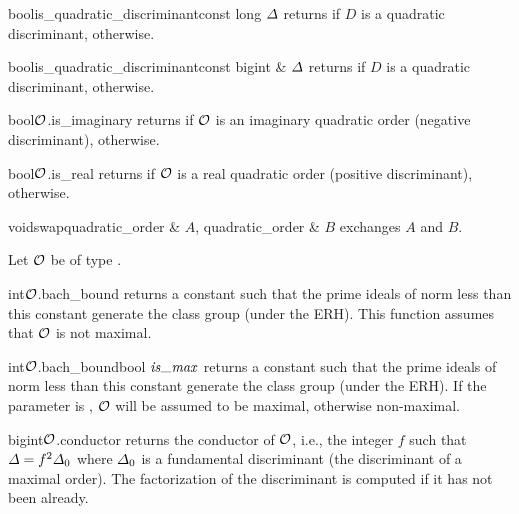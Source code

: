 
\BASIC

\begin{fcode}{bool}{is_quadratic_discriminant}{const long $\varDelta$}
  returns \TRUE if $D$ is a quadratic discriminant, \FALSE otherwise.
\end{fcode}

\begin{fcode}{bool}{is_quadratic_discriminant}{const bigint & $\varDelta$}
  returns \TRUE if $D$ is a quadratic discriminant, \FALSE otherwise.
\end{fcode}

\begin{cfcode}{bool}{$\mathcal{O}$.is_imaginary}{}
  returns \TRUE if $\mathcal{O}$ is an imaginary quadratic order (negative discriminant), \FALSE
  otherwise.
\end{cfcode}

\begin{cfcode}{bool}{$\mathcal{O}$.is_real}{}
  returns \TRUE if $\mathcal{O}$ is a real quadratic order (positive discriminant), \FALSE otherwise.
\end{cfcode}

\begin{fcode}{void}{swap}{quadratic_order & $A$, quadratic_order & $B$}
  exchanges $A$ and $B$.
\end{fcode}



\HIGH

Let $\mathcal{O}$ be of type .

\begin{fcode}{int}{$\mathcal{O}$.bach_bound}{}
  returns a constant such that the prime ideals of norm less than this constant generate the
  class group (under the ERH).  This function assumes that $\mathcal{O}$ is not maximal.
\end{fcode}

\begin{fcode}{int}{$\mathcal{O}$.bach_bound}{bool $\mathit{is\uscore max}$}
  returns a constant such that the prime ideals of norm less than this constant generate the
  class group (under the ERH).  If the parameter is \TRUE, $\mathcal{O}$ will be assumed to be maximal,
  otherwise non-maximal.
\end{fcode}

\begin{fcode}{bigint}{$\mathcal{O}$.conductor}{}
  returns the conductor of $\mathcal{O}$, i.e., the integer $f$ such that $\varDelta = f^2 \varDelta_0$ where $\varDelta_0$ is
  a fundamental discriminant (the discriminant of a maximal order).  The factorization of the
  discriminant is computed if it has not been already.
\end{fcode}

